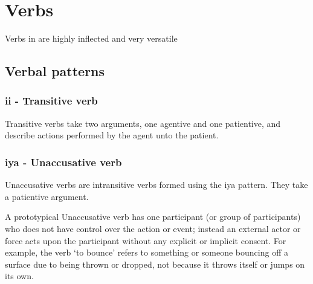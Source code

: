 \chapter{Verbs}

Verbs in \lang{} are highly inflected and very versatile

\section{Verbal patterns}


\subsection{\rootpart{}ii\rootpart{} - Transitive verb}

Transitive verbs take two arguments, one agentive and one patientive, and describe actions performed by the agent unto the patient. 

\subsection{\rootpart{}iya\rootpart{} - Unaccusative verb}

Unaccusative verbs are intransitive verbs formed using the \rootpart{}iya\rootpart{} pattern. They take a patientive argument.


A prototypical Unaccusative verb has one participant (or group of participants) who does not have control over the action or event; instead an external actor or force acts upon the participant without any explicit or implicit consent. For example, the verb \textit{} `to bounce' refers to something or someone bouncing off a surface due to being thrown or dropped, not because it throws itself or jumps on its own. 

